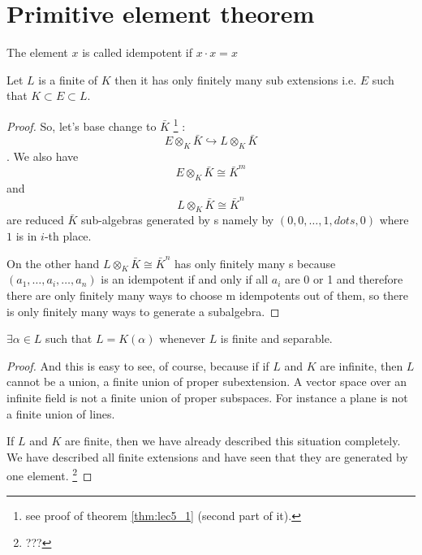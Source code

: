 \section{Primitive element theorem}

\begin{definition}[Idempotent]
  The element $x$ is called idempotent if $x \cdot x = x$
  \label{def:idempotent}
\end{definition}

\begin{theorem}
  Let $L$ is a finite  of $K$ then it
  has only finitely many sub extensions i.e. $E$ such that $K \subset
  E \subset L$.
  \begin{proof}
    So, let's base change to $\bar{K}$
    \footnote {
      see proof of theorem \ref{thm:lec5_1} (second part of it).
    }  
    :
    \[
    E \otimes_{K} \bar{K} \hookrightarrow
    L \otimes_{K} \bar{K}
    \].
    We also have
    \[
    E \otimes_{K} \bar{K} \cong \bar{K}^m
    \]
    and
    \[
    L \otimes_{K} \bar{K} \cong \bar{K}^n
    \]
    are reduced $\bar{K}$ sub-algebras generated by
    s namely by
    $\left(0,0, \dots, 1, dots, 0\right)$ where $1$ is in $i$-th
    place.

    On the other hand $L \otimes_K \bar{K} \cong \bar{K}^n$ has only
    finitely many s because 
    $\left(a_1, \dots, a_i, \dots, a_n\right)$ is an idempotent if and
    only if all $a_i$ are 0 or 1 and therefore there
    are only finitely many ways to choose m idempotents out of them,
    so there is only finitely many ways to generate a subalgebra.  
  \end{proof}
  \label{thm:primitiveelement}
\end{theorem}

\begin{corollary}
  $\exists \alpha \in L$ such that $L = K\left( \alpha \right)$
  whenever $L$ is finite and separable.
  \begin{proof}
    And this is easy to see, of course, because if 
    if $L$ and $K$ are infinite, then 
    $L$ cannot be a union, a finite union of proper subextension. 
    A vector space over an infinite field is not a finite union of
    proper subspaces.   For instance a plane is not a finite union of
    lines.
    
    If $L$ and $K$ are finite, then we have  already described this
    situation completely. We have described all finite extensions  
    and have seen that they are generated by one element.
    \footnote{???}
  \end{proof}
  \label{col:primitiveelement}
\end{corollary}

